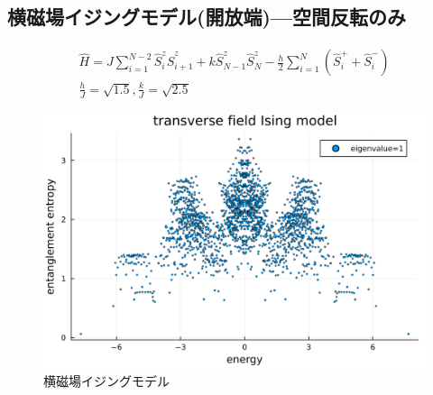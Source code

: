\documentclass{ltjsarticle}
\begin{document}
\subsection*{横磁場イジングモデル(開放端)—空間反転のみ}
\begin{gather}
  \hat{H}=J\sum_{i=1}^{N-2} \hat{S}_i^z\hat{S}_{i+1}^z + k\hat{S}_{N-1}^z\hat{S}_{N}^z - \frac{h}{2}\sum_{i=1}^{N} \left( \hat{S}_i^+ + \hat{S}_i^- \right)\\
  \frac{h}{J}=\sqrt{1.5},\frac{k}{J}=\sqrt{2.5}
\end{gather}
\begin{figure}[H]
  \centering
  \includegraphics[width=150mm]{entropy_spinflip.png}
  \caption{横磁場イジングモデル}
  \label{fig:entropy_spinflip}
\end{figure}
\end{document}
